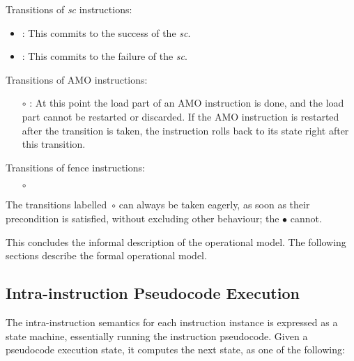 \noindent Transitions of {\em  sc} instructions:
\begin{itemize}
\item {}: This commits to the success of the {\em sc}.
\item {}: This commits to the failure of the {\em sc}.
\end{itemize}

\noindent Transitions of AMO instructions:
\begin{itemize}
\item[$\circ$] : At this point the load part of an AMO instruction is done, and the load part cannot be restarted or discarded. If the AMO instruction is restarted after the transition is taken, the instruction rolls back to its state right after this transition.
\end{itemize}

\noindent Transitions of fence instructions:
\begin{itemize}
\item[$\circ$] 
\end{itemize}

\begin{commentary}
The transitions labelled~$\circ$ can always be taken eagerly, as soon as their precondition is satisfied, without excluding other behaviour; the $\bullet$ cannot.
\end{commentary}

This concludes the informal description of the operational model.
The following sections describe the formal operational model.

\subsection{Intra-instruction Pseudocode Execution}
The intra-instruction semantics for each instruction instance is expressed as a state machine, essentially running the instruction pseudocode.
Given a pseudocode execution state, it computes the next state, as one of the following:

